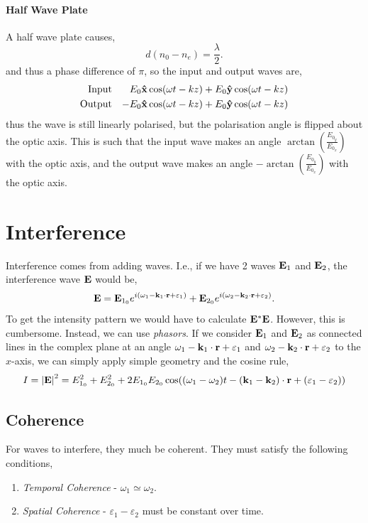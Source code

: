 \documentclass{book}
\begin{document}
{\subsubsection{Half Wave Plate}
A half wave plate causes,
\begin{equation}
	d(n_0 - n_e) = \frac{\lambda}{2}.
\end{equation}
and thus a phase difference of $\pi$, so the input and output waves are,
\begin{align}
	\text{Input} && E_0\vu{x}\cos(\omega t - kz) + E_0\vu{y}\cos(\omega t - kz) \\
	\text{Output} && -E_0\vu{x}\cos(\omega t - kz) + E_0\vu{y}\cos(\omega t - kz)
\end{align}
thus the wave is still linearly polarised, but the polarisation angle is flipped about the optic axis. This is such that the input wave makes an angle $\arctan\left(\frac{E_{0_y}}{E_{0_x}}\right)$ with the optic axis, and the output wave makes an angle $-\arctan\left(\frac{E_{0_y}}{E_{0_x}}\right)$ with the optic axis.
\chapter{Interference}
Interference comes from adding waves. I.e., if we have 2 waves $\vb{E}_1$ and $\vb{E}_2$, the interference wave $\vb{E}$ would be,
\begin{equation}
	\vb{E} = \vb{E}_{1_0} e^{i(\omega_1 -\vb{k}_1\cdot{\vb{r}} + \varepsilon_1)} + \vb{E}_{2_0} e^{i(\omega_2 -\vb{k}_2\cdot{\vb{r}} + \varepsilon_2)}.
\end{equation}
To get the intensity pattern we would have to calculate $\vb{E}^*\vb{E}$. However, this is cumbersome. Instead, we can use \textit{phasors}. If we consider $\vb{E}_1$ and $\vb{E}_2$ as connected lines in the complex plane at an angle $\omega_1 -\vb{k}_1\cdot{\vb{r}} + \varepsilon_1$ and $ \omega_2 -\vb{k}_2\cdot{\vb{r}} + \varepsilon_2$ to the $x$-axis, we can simply apply simple geometry and the cosine rule,
\begin{equation}
	I = \abs{\vb{E}}^2 = E_{1_0}^2 + E_{2_0}^2 + 2E_{1_0}E_{2_0}\cos((\omega_1 - \omega_2)t -(\vb{k}_1 - \vb{k}_2)\cdot\vb{r} + (\varepsilon_1 - \varepsilon_2))
\end{equation}
\section{Coherence}
For waves to interfere, they much be coherent. They must satisfy the following conditions,
\begin{enumerate}
	\item \textit{Temporal Coherence} - $\omega_1 \simeq \omega_2$.
	\item \textit{Spatial Coherence} - $\varepsilon_1 - \varepsilon_2$ must be constant over time.
\end{enumerate}
}
\end{document}
